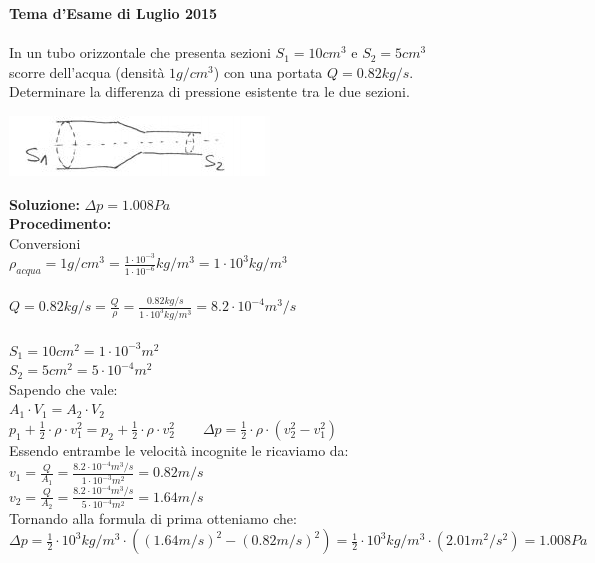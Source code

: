 \begin{figure}[h!]
\textbf{Tema d'Esame di Luglio 2015}\\ \\
In un tubo orizzontale che presenta sezioni $S_1=10cm^3$ e $S_2=5cm^3$ scorre dell'acqua (densità $1g/cm^3$) con una portata $Q=0.82kg/s$. Determinare la differenza di pressione esistente tra le due sezioni.
\\
\begin{center}
		\includegraphics[scale=1.6]{ES4/LUG042015.jpg}
	\end{center}
    
    \begin{boxed}
		\null\hfill \textbf{Soluzione:} $\Delta p =1.008Pa$\\
		\textbf{Procedimento:}  \\ 
Conversioni\\
$\rho_{acqua}=1g/cm^3=\frac{1\cdot 10^{-3}}{1\cdot 10^{-6}}kg/m^3=1\cdot 10^3kg/m^3 $\\\\
$Q=0.82kg/s= \frac{Q}{\rho}=\frac{0.82kg/s}{1\cdot10^3kg/m^3}=8.2\cdot10^{-4}m^3/s$\\ \\
$S_1=10cm^2 =1\cdot 10^{-3}m^2$\\
$S_2=5cm^2 =5\cdot 10^{-4}m^2$\\

Sapendo che vale:\\
$A_1\cdot V_1=A_2\cdot V_2$\\
$p_1 + \frac{1}{2}\cdot \rho \cdot v^2_1 = p_2 + \frac{1}{2}\cdot \rho \cdot v^2_2 \qquad \Delta p=\frac{1}{2}\cdot \rho \cdot (v^2_2 - v^2_1)$\\
Essendo entrambe le velocità incognite le ricaviamo da:\\
$v_1=\frac{Q}{A_1}=\frac{8.2\cdot10^{-4}m^3/s}{1\cdot 10^{-3}m^2}=0.82m/s$\\
$v_2=\frac{Q}{A_2}=\frac{8.2\cdot10^{-4}m^3/s}{5\cdot 10^{-4}m^2}=1.64m/s$\\
Tornando alla formula di prima otteniamo che:\\
$\Delta p=\frac{1}{2}\cdot 10^3kg/m^3 \cdot ((1.64m/s)^2 - (0.82m/s)^2)=\frac{1}{2}\cdot 10^3kg/m^3 \cdot (2.01m^2/s^2) =1.008Pa$
\end{boxed}
\end{figure}
